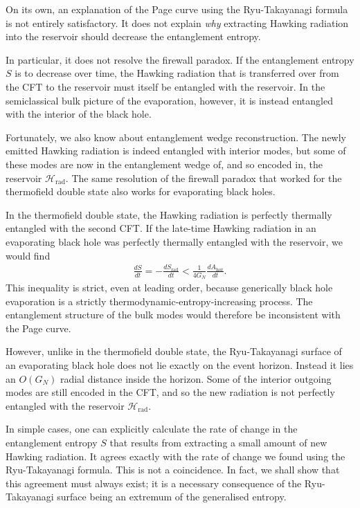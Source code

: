 \documentclass[11pt,a4paper]{article}
\newcommand{\Srad}{S_\text{rad} }
\begin{document}
On its own, an explanation of the Page curve using the Ryu-Takayanagi formula is not entirely satisfactory. It does not explain \emph{why} extracting Hawking radiation into the reservoir should decrease the entanglement entropy. 

In particular, it does not resolve the firewall paradox. If the entanglement entropy $S$ is to decrease over time, the Hawking radiation that is transferred over from the CFT to the reservoir must itself be entangled with the reservoir. In the semiclassical bulk picture of the evaporation, however, it is instead entangled with the interior of the black hole.

Fortunately, we also know about entanglement wedge reconstruction. The newly emitted Hawking radiation is indeed entangled with interior modes, but some of these modes are now in the entanglement wedge of, and so encoded in, the reservoir $\mathcal{H}_\text{rad}$. The same resolution of the firewall paradox that worked for the thermofield double state also works for evaporating black holes. 

In the thermofield double state, the Hawking radiation is perfectly thermally entangled with the second CFT. If the late-time Hawking radiation in an evaporating black hole was perfectly thermally entangled with the reservoir, we would find
\begin{align}
\frac{dS}{dt} = -\frac{d\Srad}{dt} < \frac{1}{4 G_N}\frac{d A_\text{hor}}{dt}.
\end{align}
This inequality is strict, even at leading order, because generically black hole evaporation is a strictly thermodynamic-entropy-increasing process. The entanglement structure of the bulk modes would therefore be inconsistent with the Page curve.

However, unlike in the thermofield double state, the Ryu-Takayanagi surface of an evaporating black hole does not lie exactly on the event horizon. Instead it lies an $O(G_N)$ radial distance inside the horizon. Some of the interior outgoing modes are still encoded in the CFT, and so the new radiation is not perfectly entangled with the reservoir $\mathcal{H}_\text{rad}$.

In simple cases, one can explicitly calculate the rate of change in the entanglement entropy $S$ that results from extracting a small amount of new Hawking radiation. It agrees exactly with the rate of change we found using the Ryu-Takayanagi formula. This is not a coincidence. In fact, we shall show that this agreement must always exist; it is a necessary consequence of the Ryu-Takayanagi surface being an extremum of the generalised entropy.
\end{document}
